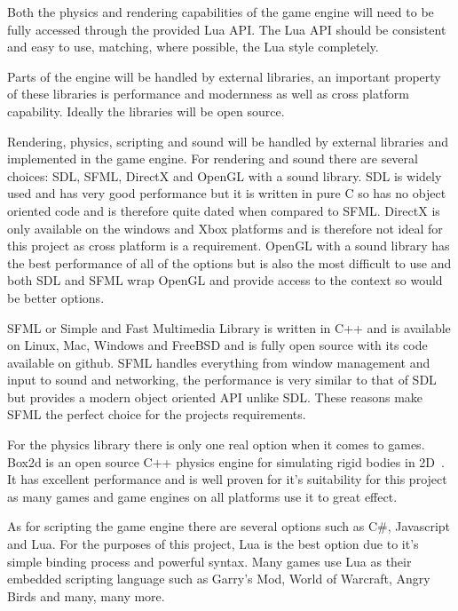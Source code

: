 \documentclass[11pt,a4paper,titlepage]{report}
\begin{document}
	Both the physics and rendering capabilities of the game engine will need to be fully accessed through the provided Lua API. The Lua API should be consistent and easy to use, matching, where possible, the Lua style completely.


	Parts of the engine will be handled by external libraries, an important property of these libraries is performance and modernness as well as cross platform capability. Ideally the libraries will be open source.

	Rendering, physics, scripting and sound will be handled by external libraries and implemented in the game engine. For rendering and sound there are several choices: SDL, SFML, DirectX and OpenGL with a sound library. SDL is widely used and has very good performance but it is written in pure C so has no object oriented code and is therefore quite dated when compared to SFML. DirectX is only available on the windows and Xbox platforms and is therefore not ideal for this project as cross platform is a requirement. OpenGL with a sound library has the best performance of all of the options but is also the most difficult to use and both SDL and SFML wrap OpenGL and provide access to the context so would be better options.

	SFML or Simple and Fast Multimedia Library is written in C++ and is available on Linux, Mac, Windows and FreeBSD and is fully open source with its code available on github. SFML handles everything from window management and input to sound and networking, the performance is very similar to that of SDL but provides a modern object oriented API unlike SDL. These reasons make SFML the perfect choice for the projects requirements.

	For the physics library there is only one real option when it comes to games. Box2d is an open source C++ physics engine for simulating rigid bodies in 2D~\cite{Box2D}. It has excellent performance and is well proven for it's suitability for this project as many games and game engines on all platforms use it to great effect.

	As for scripting the game engine there are several options such as C\#, Javascript and Lua. For the purposes of this project, Lua is the best option due to it's simple binding process and powerful syntax. Many games use Lua as their embedded scripting language such as Garry's Mod, World of Warcraft, Angry Birds and many, many more.

\end{document}
